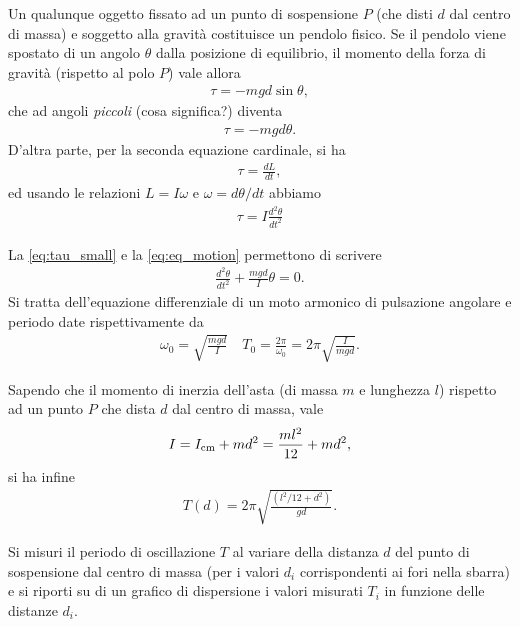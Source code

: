 \documentclass{lab1-article}
\begin{document}
\begin{article}
Un qualunque oggetto fissato ad un punto di sospensione $P$ (che disti $d$
dal centro di massa) e soggetto alla gravit\`a costituisce un pendolo fisico.
Se il pendolo viene spostato di un angolo $\theta$ dalla posizione di
equilibrio, il momento della forza di gravit\`a (rispetto al polo $P$) vale
allora
\begin{align*}
  \tau = -mgd \sin\theta,
\end{align*}
che ad angoli \emph{piccoli} (cosa significa?) diventa
\begin{align}\label{eq:tau_small}
  \tau = - mgd\theta.
\end{align}
D'altra parte, per la seconda equazione cardinale, si ha
\begin{align*}
  \tau = \frac{dL}{dt},
\end{align*}
ed usando le relazioni $L = I\omega$ e $\omega = d\theta/dt$ abbiamo
\begin{align}\label{eq:eq_motion}
  \tau = I \frac{d^2\theta}{dt^2}
\end{align}

La \eqref{eq:tau_small} e la \eqref{eq:eq_motion} permettono di scrivere
\begin{align}
\frac{d^2\theta}{dt^2} + \frac{mgd}{I}\theta = 0.
\end{align}
Si tratta dell'equazione differenziale di un moto armonico di pulsazione
angolare e periodo date rispettivamente da
\begin{align*}
  \omega_0 = \sqrt{\frac{mgd}{I}} \quad
  T_0 = \frac{2\pi}{\omega_0} = 2\pi\sqrt{\frac{I}{mgd}}.
\end{align*}

Sapendo che il momento di inerzia dell'asta (di massa $m$ e lunghezza $l$)
rispetto ad un punto $P$ che dista $d$ dal centro di massa, vale
\begin{align*}
  I = I_{\rm cm} + md^2 = \frac{ml^2}{12} + md^2,
\end{align*}
si ha infine
\begin{align}\label{eq:period}
  T(d) = 2\pi\sqrt{\frac{(l^2/12 + d^2)}{gd}}.
\end{align}



Si misuri il periodo di oscillazione $T$ al variare della distanza $d$ del
punto di sospensione dal centro di massa (per i valori $d_i$ corrispondenti ai
fori nella sbarra) e si riporti su di un grafico di dispersione i valori
misurati $T_i$ in funzione delle distanze $d_i$.


\end{article}
\end{document}
